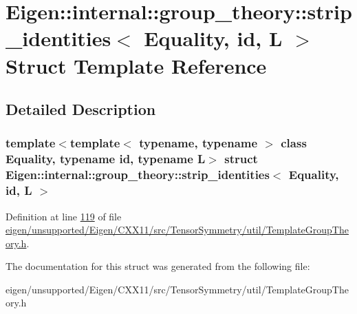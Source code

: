 \hypertarget{struct_eigen_1_1internal_1_1group__theory_1_1strip__identities}{}\section{Eigen\+:\+:internal\+:\+:group\+\_\+theory\+:\+:strip\+\_\+identities$<$ Equality, id, L $>$ Struct Template Reference}
\label{struct_eigen_1_1internal_1_1group__theory_1_1strip__identities}


\subsection{Detailed Description}
\subsubsection*{template$<$template$<$ typename, typename $>$ class Equality, typename id, typename L$>$\newline
struct Eigen\+::internal\+::group\+\_\+theory\+::strip\+\_\+identities$<$ Equality, id, L $>$}



Definition at line \hyperlink{eigen_2unsupported_2_eigen_2_c_x_x11_2src_2_tensor_symmetry_2util_2_template_group_theory_8h_source_l00119}{119} of file \hyperlink{eigen_2unsupported_2_eigen_2_c_x_x11_2src_2_tensor_symmetry_2util_2_template_group_theory_8h_source}{eigen/unsupported/\+Eigen/\+C\+X\+X11/src/\+Tensor\+Symmetry/util/\+Template\+Group\+Theory.\+h}.



The documentation for this struct was generated from the following file\+:\begin{DoxyCompactItemize}
\item 
eigen/unsupported/\+Eigen/\+C\+X\+X11/src/\+Tensor\+Symmetry/util/\+Template\+Group\+Theory.\+h\end{DoxyCompactItemize}

